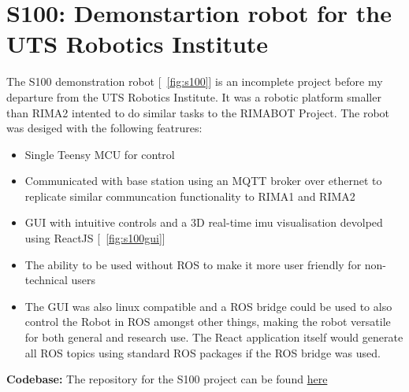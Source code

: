 \newpage
\section{S100: Demonstartion robot for the UTS Robotics Institute} 
\label{sec:s100}
The S100 demonstration robot [~\ref{fig:s100}] is an incomplete project before my departure from the UTS Robotics Institute. It was a robotic platform smaller than RIMA2 intented to do similar tasks to the RIMABOT Project. The robot
was desiged with the following featrures:

\begin{itemize}
    \item Single Teensy MCU for control
    \item Communicated with base station using an MQTT broker over ethernet to replicate similar communcation functionality to RIMA1 and RIMA2
    \item GUI with intuitive controls and a 3D real-time imu visualisation devolped using ReactJS [~\ref{fig:s100gui}]
    \item The ability to be used without ROS to make it more user friendly for non-technical users
    \item The GUI was also linux compatible and a ROS bridge could be used to also control the Robot in ROS amongst other things, making the robot versatile for both general and research use. The React application
itself would generate all ROS topics using standard ROS packages if the ROS bridge was used.
\end{itemize}

\textbf{Codebase: } The repository for the S100 project can be found \href{https://github.com/jackfruittt/S100_Interface}{here}

\newpage
{}
